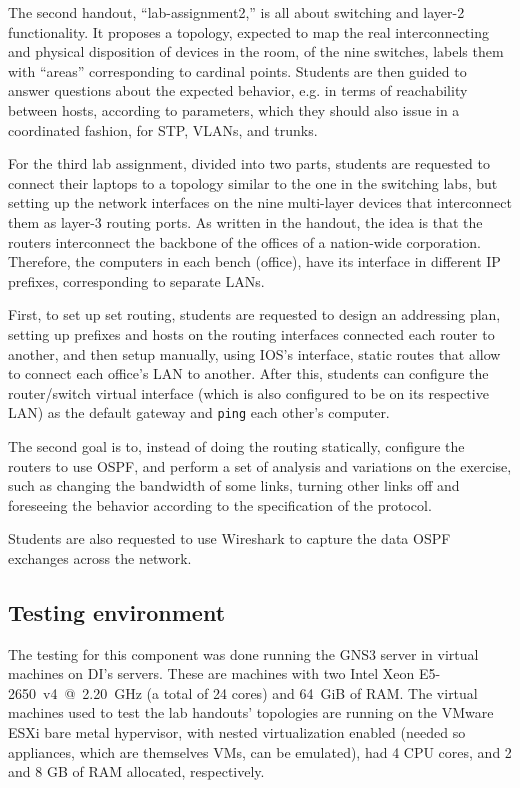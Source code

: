 The second handout, ``lab-assignment2,'' is all about switching and layer-2 functionality.
It proposes a topology, expected to map the real interconnecting and physical disposition of devices in the room, of the nine switches, labels them with ``areas'' corresponding to cardinal points.
Students are then guided to answer questions about the expected behavior, e.g. in terms of reachability between hosts, according to parameters, which they should also issue in a coordinated fashion, for STP, VLANs, and trunks.

For the third lab assignment, divided into two parts, students are requested to connect their laptops to a topology similar to the one in the switching labs, but setting up the network interfaces on the nine multi-layer devices that interconnect them as layer-3 routing ports.
As written in the handout, the idea is that the routers interconnect the backbone of the offices of a nation-wide corporation.
Therefore, the computers in each bench (office), have its interface in different IP prefixes, corresponding to separate LANs. %

First, to set up set routing, students are requested to design an addressing plan, setting up prefixes and hosts on the routing interfaces connected each router to another, and then setup manually, using IOS's interface, static routes that allow to connect each office's LAN to another.
After this, students can configure the router/switch virtual interface (which is also configured to be on its respective LAN) as the default gateway and \texttt{ping} each other's computer.

The second goal is to, instead of doing the routing statically, configure the routers to use OSPF, and perform a set of analysis and variations on the exercise, such as changing the bandwidth of some links, turning other links off and foreseeing the behavior according to the specification of the protocol.

Students are also requested to use Wireshark to capture the data OSPF exchanges across the network.

\subsection{Testing environment}
\label{subsec:environment}

The testing for this component was done running the GNS3 server in virtual machines on DI's servers. %
These are machines with two Intel Xeon E5-2650~v4~@~2.20~GHz (a total of 24 cores) and 64~GiB of RAM.
The virtual machines used to test the lab handouts' topologies are running on the VMware ESXi bare metal hypervisor, with nested virtualization enabled (needed so appliances, which are themselves VMs, can be emulated), had 4 CPU cores, and 2 and 8 GB of RAM allocated, respectively.

